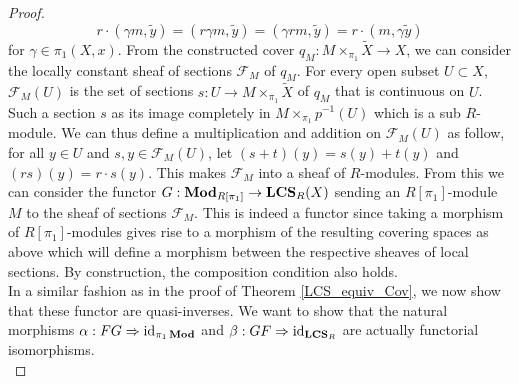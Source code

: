 \documentclass{article}
\theoremstyle{plain}
\theoremstyle{definition}
\DeclareMathOperator{\id}{id}
\DeclareMathOperator{\LCS}{\bf{LCS}}
\DeclareMathOperator{\Mod}{\bf{Mod}}
\begin{document}
\begin{proof}
    $$r\cdot(\gamma m,\widetilde{y}) = (r\gamma m, \widetilde{y}) = (\gamma rm,\widetilde{y})= r\cdot(m,\gamma\widetilde{y})$$
    for $\gamma \in \pi_1(X,x)$.
    From the constructed cover $q_M:M\times_{\pi_1}\widetilde{X}\rightarrow X$, we can consider the locally constant sheaf of sections $\mathcal{F}_M$ of $q_M$.
    For every open subset $U\subset X$, $\mathcal{F}_M(U)$ is the set of sections $s:U\rightarrow M\times_{\pi_1}\widetilde{X}$ of $q_M$ that is continuous on $U$.
    Such a section $s$ as its image completely in $M\times_{\pi_1}p^{-1}(U)$ which is a sub $R$-module. We can thus define a multiplication and addition on $\mathcal{F}_M(U)$ as follow,
    for all $y\in U$ and $s,y\in\mathcal{F}_M(U)$, let $(s+t)(y) = s(y)+t(y)$ and $(rs)(y) = r\cdot s(y)$. This makes $\mathcal{F}_M$ into a sheaf of $R$-modules.
    From this we can consider the functor $G:\Mod_{R[\pi_1]}\rightarrow \LCS_R(X)$ sending an $R[\pi_1]$-module $M$ to the sheaf of sections $\mathcal{F}_M$.
    This is indeed a functor since taking a morphism of $R[\pi_1]$-modules gives rise to a morphism of the resulting covering spaces as above which will define a morphism between the respective sheaves of local sections. By construction, the composition condition also holds.\\
    In a similar fashion as in the proof of Theorem \ref{LCS_equiv_Cov}, we now show that these functor are quasi-inverses.
    We want to show that the natural morphisms $\alpha :FG \Rightarrow \id_{\pi_1\Mod}$ and $\beta: GF\Rightarrow \id_{\LCS_R}$ are actually functorial isomorphisms.\\

\end{proof}
\end{document}
